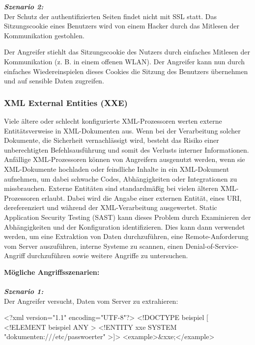 \textbf{\textit{Szenario 2:}}\\

Der Schutz der authentifizierten Seiten findet nicht mit SSL statt. Das Sitzungscookie eines Benutzers wird von einem Hacker durch das Mitlesen der Kommunikation gestohlen.

Der Angreifer stiehlt das Sitzungscookie des Nutzers durch einfaches Mitlesen der Kommunikation (z. B. in einem offenen WLAN). Der Angreifer kann nun durch einfaches Wiedereinspielen dieses Cookies die Sitzung des Benutzers übernehmen und auf sensible Daten zugreifen\cite{owasp13top10}.

\subsubsection{XML External Entities (XXE)}

Viele ältere oder schlecht konfigurierte XML-Prozessoren werten externe Entitätsverweise in XML-Dokumenten aus. Wenn bei der Verarbeitung solcher Dokumente, die Sicherheit vernachlässigt wird, besteht das Risiko einer unberechtigten Befehlsausführung und somit des Verlusts interner Informationen. Anfällige XML-Prozessoren können von Angreifern ausgenutzt werden, wenn sie XML-Dokumente hochladen oder feindliche Inhalte in ein XML-Dokument aufnehmen, um dabei schwache Codes, Abhängigkeiten oder Integrationen zu missbrauchen. Externe Entitäten sind standardmäßig bei vielen älteren XML-Prozessoren erlaubt. Dabei wird die Angabe einer externen Entität, eines URI, dereferenziert und während der XML-Verarbeitung ausgewertet. Static Application Security Testing (SAST) kann dieses Problem durch Examinieren der Abhängigkeiten und der Konfiguration identifizieren. Dies kann dann verwendet werden, um eine Extraktion von Daten durchzuführen, eine Remote-Anforderung vom Server auszuführen, interne Systeme zu scannen, einen Denial-of-Service-Angriff durchzuführen sowie weitere Angriffe zu untersuchen\cite[10]{owasp17top10}.

\textbf{Mögliche Angriffsszenarien:}\\
\\
\textbf{\textit{Szenario 1:}}\\
Der Angreifer versucht, Daten vom Server zu extrahieren\cite[10]{owasp17top10}:\\

\begin{LaTeXCode}[caption={XML-Beispiel},captionpos=b, label=LaTeXCode:xxe1][numbers=none]
<?xml version="1.1" encoding="UTF-8"?>
<!DOCTYPE beispiel [
<!ELEMENT beispiel ANY >
<!ENTITY xxe SYSTEM "dokumenten:///etc/passwoerter" >]>
<example>\&xxe;</example>
\end{LaTeXCode}

